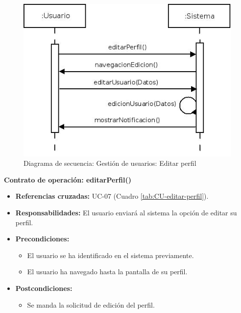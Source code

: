 \begin{figure}[H]
\centering
  \includegraphics[scale=.55]{img/secuencias/gestion-usuarios-editar-perfil.jpeg}
  \caption{Diagrama de secuencia: Gestión de usuarios: Editar perfil}
  \label{fig:secuencia-gestion-usuarios-editar-perfil}
\end{figure}

\textbf{Contrato de operación: editarPerfil()}
\begin{itemize}
\item \textbf{Referencias cruzadas:} UC-07 (Cuadro \ref{tab:CU-editar-perfil}).
\item \textbf{Responsabilidades:} El usuario enviará al sistema la opción de editar su perfil.
\item \textbf{Precondiciones:} 
 \begin{itemize}
\item El usuario se ha identificado en el sistema previamente.
\item El usuario ha navegado hasta la pantalla de su perfil.
\end {itemize}
\item \textbf{Postcondiciones:} 
 \begin{itemize}
\item Se manda la solicitud de edición del perfil.
\end {itemize}
\end {itemize}

